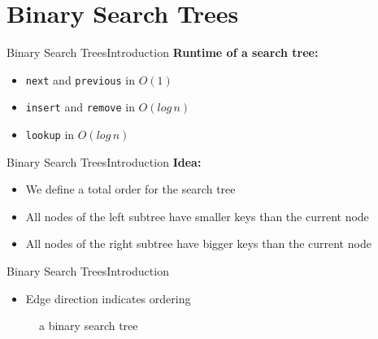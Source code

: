 \section{Binary Search Trees}

\begin{frame}{Binary Search Trees}{Introduction}
  \textbf{Runtime of a search tree:}
  \begin{itemize}
    \item<2->
      {\color{Mittel-Blau}\texttt{next}} and
      {\color{Mittel-Blau}\texttt{previous}} in $O(1)$\\[0.5em]
      \vspace{1em}
  \item<4->
    {\color{Mittel-Blau}\texttt{insert}} and
    {\color{Mittel-Blau}\texttt{remove}} in $O(log\,n)$
    \vspace{1em}
  \item<5->
    {\color{Mittel-Blau}\texttt{lookup}} in $O(log\,n)$\\[0.5em]
  \end{itemize}
\end{frame}


\begin{frame}{Binary Search Trees}{Introduction}
  \textbf{Idea:}
  \begin{itemize}
    \item<2->
      We define a total order for the search tree
    \item<3->
      All nodes of the left subtree have {\color{Mittel-Blau}smaller keys}
      than the current node
    \item<4->
      All nodes of the right subtree have {\color{Mittel-Blau}bigger keys}
      than the current node
  \end{itemize}
\end{frame}


\begin{frame}{Binary Search Trees}{Introduction}
  \begin{itemize}
    \item
      Edge direction indicates ordering
  \end{itemize}
  \begin{figure}
    
    \caption{a binary search tree}
    \label{fig:binary_search_trees:binary_tree_example1}
  \end{figure}
\end{frame}

